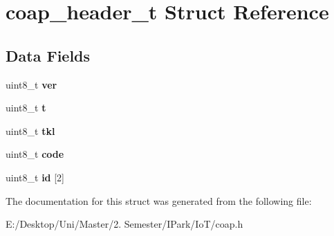\hypertarget{structcoap__header__t}{}\section{coap\+\_\+header\+\_\+t Struct Reference}
\label{structcoap__header__t}
\subsection*{Data Fields}
\begin{DoxyCompactItemize}
\item 
\mbox{\label{structcoap__header__t_ae106cd5a700482b11ccde5ee231f6350}} 
uint8\+\_\+t {\bfseries ver}
\item 
\mbox{\label{structcoap__header__t_a2d03918f4f9edabaf3c9f43abcc2d85b}} 
uint8\+\_\+t {\bfseries t}
\item 
\mbox{\label{structcoap__header__t_aaf17947c9fa22c388ef4b2db2aa0d4e0}} 
uint8\+\_\+t {\bfseries tkl}
\item 
\mbox{\label{structcoap__header__t_a966576744a473fafb7687f8e5649941f}} 
uint8\+\_\+t {\bfseries code}
\item 
\mbox{\label{structcoap__header__t_aef59130c46d56c87da24bde038c75cbf}} 
uint8\+\_\+t {\bfseries id} \mbox{[}2\mbox{]}
\end{DoxyCompactItemize}


The documentation for this struct was generated from the following file\+:\begin{DoxyCompactItemize}
\item 
E\+:/\+Desktop/\+Uni/\+Master/2. Semester/\+I\+Park/\+Io\+T/coap.\+h\end{DoxyCompactItemize}
